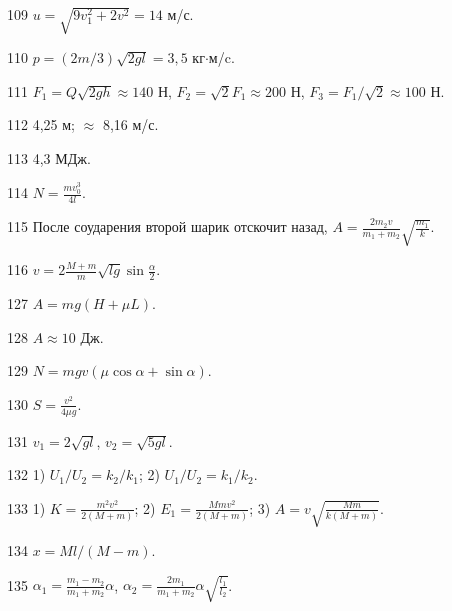 \begin{Answer}{109}
$u = \sqrt{9v_{1}^2 + 2v^2} = 14$ м/с.
\end{Answer}
\begin{Answer}{110}
$p = (2m/3)\sqrt{2gl} = 3,5$ кг$\cdot$м/c.
\end{Answer}
\begin{Answer}{111}
$F_1 = Q\sqrt{2gh} \approx 140$ Н, $F_2 = \sqrt{2} F_1 \approx 200$ Н, $F_3 = F_1/\sqrt{2} \approx 100$ Н.
\end{Answer}
\begin{Answer}{112}
4,25 м; $\approx$ 8,16 м/с.
\end{Answer}
\begin{Answer}{113}
4,3 МДж.
\end{Answer}
\begin{Answer}{114}
$N =\frac{mv_{0}^3}{4l}$.
\end{Answer}
\begin{Answer}{115}
После соударения второй шарик отскочит назад, $A = \frac{2m_2v}{m_1+m_2}\sqrt{\frac{m_1}{k}}$.
\end{Answer}
\begin{Answer}{116}
$v = 2\frac{M+m}{m}\sqrt{lg}\sin \frac{\alpha}{2}$.
\end{Answer}
\begin{Answer}{127}
$A=mg(H+\mu L)$.
\end{Answer}
\begin{Answer}{128}
$A \approx 10$ Дж.
\end{Answer}
\begin{Answer}{129}
$N = mgv(\mu \cos \alpha +\sin \alpha)$.
\end{Answer}
\begin{Answer}{130}
$S = \frac{v^2}{4 \mu g}$.
\end{Answer}
\begin{Answer}{131}
$v_1 = 2\sqrt{gl}$, $v_2 = \sqrt{5gl}$.
\end{Answer}
\begin{Answer}{132}
1) $U_1/U_2 = k_2/k_1$; 2) $U_1/U_2 = k_1/k_2$.
\end{Answer}
\begin{Answer}{133}
1) $K=\frac{m^2v^2}{2(M+m)}$; 2) $E_1 = \frac{Mmv^2}{2(M+m)}$; 3) $A = v\sqrt{\frac{Mm}{k(M+m)}}$.
\end{Answer}
\begin{Answer}{134}
$x = Ml/(M-m)$.
\end{Answer}
\begin{Answer}{135}
$\alpha_1 =\frac{m_1-m_2}{m_1+m_2}\alpha$, $\alpha_2 =\frac{2m_1}{m_1+m_2}\alpha \sqrt{\frac{l_1}{l_2}}$.
\end{Answer}
